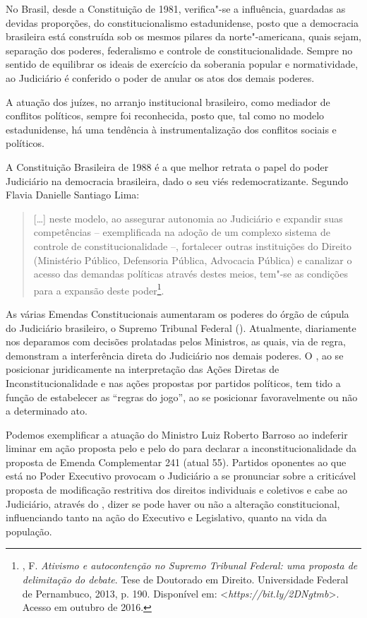No Brasil, desde a Constituição de 1981, verifica"-se a influência,
guardadas as devidas proporções, do constitucionalismo estadunidense,
posto que a democracia brasileira está construída sob os mesmos pilares
da norte"-americana, quais sejam, separação dos poderes, federalismo e
controle de constitucionalidade. Sempre no sentido de equilibrar os
ideais de exercício da soberania popular e normatividade, ao Judiciário
é conferido o poder de anular os atos dos demais poderes.

A atuação dos juízes, no arranjo institucional brasileiro, como mediador
de conflitos políticos, sempre foi reconhecida, posto que, tal como no
modelo estadunidense, há uma tendência à instrumentalização dos
conflitos sociais e políticos.

A Constituição Brasileira de 1988 é a que melhor retrata o papel do
poder Judiciário na democracia brasileira, dado o seu viés
redemocratizante. Segundo Flavia Danielle Santiago Lima:

\begin{quote}
{[}\ldots{}{]} neste modelo, ao assegurar autonomia ao Judiciário e expandir
suas competências -- exemplificada na adoção de um complexo sistema de
controle de constitucionalidade --, fortalecer outras instituições do
Direito (Ministério Público, Defensoria Pública, Advocacia Pública) e
canalizar o acesso das demandas políticas através destes meios, tem"-se
as condições para a expansão deste poder\footnote{, F.
\emph{Ativismo e autocontenção no Supremo Tribunal Federal: uma
  proposta de delimitação do debate}. Tese de Doutorado em
  Direito. Universidade Federal de Pernambuco, 2013, p. 190. Disponível
  em: \textless{}\emph{https://bit.ly/2DNgtmb}\textgreater{}. Acesso em outubro de 2016.}.
\end{quote}

As várias Emendas Constitucionais aumentaram os poderes do órgão de
cúpula do Judiciário brasileiro, o Supremo Tribunal Federal ().
Atualmente, diariamente nos deparamos com decisões prolatadas pelos
Ministros, as quais, via de regra, demonstram a interferência direta do
Judiciário nos demais poderes. O , ao se posicionar juridicamente na
interpretação das Ações Diretas de Inconstitucionalidade e nas ações
propostas por partidos políticos, tem tido a função de estabelecer as
``regras do jogo'', ao se posicionar favoravelmente ou não a determinado
ato.

Podemos exemplificar a atuação do Ministro Luiz Roberto Barroso ao
indeferir liminar em ação proposta pelo  e pelo do para declarar
a inconstitucionalidade da proposta de Emenda Complementar 241 (atual
 55). Partidos oponentes ao que está no Poder Executivo provocam o
Judiciário a se pronunciar sobre a criticável proposta de modificação
restritiva dos direitos individuais e coletivos e cabe ao Judiciário,
através do , dizer se pode haver ou não a alteração constitucional,
influenciando tanto na ação do Executivo e Legislativo, quanto na vida
da população.

